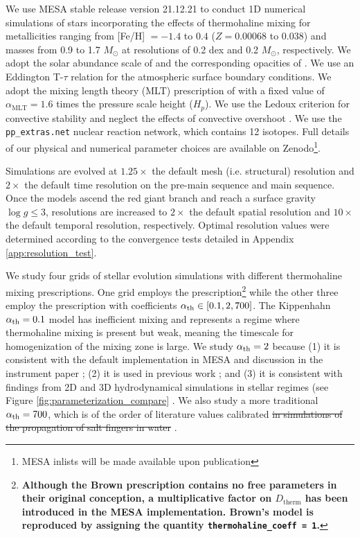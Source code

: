 %
%
%
We use MESA stable release version 21.12.21 to conduct 1D numerical simulations of stars incorporating the effects of thermohaline mixing for metallicities ranging from [Fe/H] $= -1.4$ to $0.4$ ($Z = 0.00068$ to $0.038$) and masses from 0.9 to 1.7 $M_{\odot}$ at resolutions of 0.2 dex and 0.2 $M_{\odot}$, respectively. We adopt the solar abundance scale of \citet{GrevesseSauval1998} and the corresponding opacities of \citet{IglesiasRogers1996}. We use an Eddington T-$\tau$ relation for the atmospheric surface boundary conditions.
We adopt the mixing length theory (MLT) prescription of \citet{Cox1980} with a fixed value of $\alpha_{\text{MLT}}= 1.6$ times the pressure scale height ($H_p$). We use the Ledoux criterion for convective stability and neglect the effects of convective overshoot \citep{Ledoux1947}. We use the \verb|pp_extras.net| nuclear reaction network, which contains 12 isotopes. Full details of our physical and numerical parameter choices are available on Zenodo\footnote{MESA inlists will be made available upon publication}. 

Simulations are evolved at $1.25\times$ the default mesh (i.e. structural) resolution and $2\times$ the default time resolution on the pre-main sequence and main sequence. Once the models ascend the red giant branch and reach a surface gravity $\log g \le 3$, resolutions are increased to $2\times$ the default spatial resolution and $10\times$ the default temporal resolution, respectively. Optimal resolution values were determined according to the convergence tests detailed in Appendix \ref{app:resolution_test}. 

We study four grids of stellar evolution simulations with different thermohaline mixing prescriptions. One grid employs the \citet{brown_etal_2013} prescription\footnote{\textbf{Although the Brown prescription contains no free parameters in their original conception, a multiplicative factor on $D_{\text{therm}}$ has been introduced in the MESA implementation. Brown's model is reproduced by assigning the quantity \texttt{thermohaline\_coeff = 1}.} }
%
%
while the other three employ the \citet{kippenhahn_etal_1980} prescription with coefficients $\alpha_{\rm th} \in [0.1, 2, 700]$. 
The Kippenhahn $\alpha_{\rm th} = 0.1$ model has inefficient mixing and represents a regime where thermohaline mixing is present but weak, meaning the timescale for homogenization of the mixing zone is large.
%
%
We study $\alpha_{\rm th} = 2$ because (1) it is consistent with the default implementation in MESA and discussion in the instrument paper \citep{paxton2013}; (2) it is used in previous work \citep{CantielloLanger2010, TayarJoyce22}; and (3) it is consistent with findings from 2D and 3D hydrodynamical simulations in stellar regimes (see Figure \ref{fig:parameterization_compare} \citep{Denissenkov2010, Traxler2011, brown_etal_2013}. We also study a more traditional $\alpha_{\rm th} = 700$, which is of the order of literature values calibrated \sout{in simulations of the propagation of salt fingers in water}  \citep{lattanzio_etal_2015, charbonnel_thermohaline_2007}.

